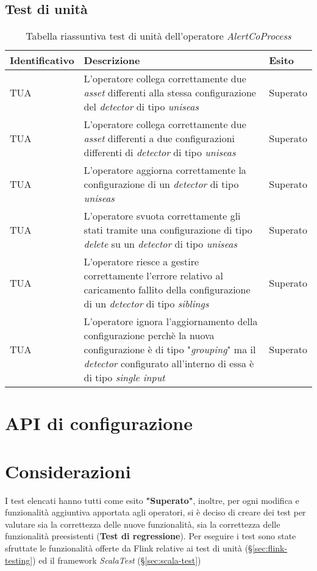\subsection{Test di unità}
{
\centering
\begin{longtable}{L{3cm} L{8.5cm} L{2cm}}
\caption{Tabella riassuntiva test di unità dell'operatore \textit{AlertCoProcess}}\\
\textbf{Identificativo} &
\textbf{Descrizione}&
\textbf{Esito}\\
\endhead
\hline

TUA & L'operatore collega correttamente due \textit{asset} differenti alla stessa configurazione del \textit{detector} di tipo \textit{uniseas} & Superato\\
\hline
TUA & L'operatore collega correttamente due \textit{asset} differenti a due configurazioni differenti di \textit{detector} di tipo \textit{uniseas} & Superato \\
\hline
TUA &  L'operatore aggiorna correttamente la configurazione di un \textit{detector} di tipo \textit{uniseas} & Superato\\
\hline
TUA & L'operatore svuota correttamente gli stati tramite una configurazione di tipo \textit{delete} su un \textit{detector} di tipo \textit{uniseas} & Superato \\
\hline
TUA & L'operatore riesce a gestire correttamente l'errore relativo al caricamento fallito della configurazione di un \textit{detector} di tipo \textit{siblings} & Superato\\
\hline
TUA & L'operatore ignora l'aggiornamento della configurazione perchè la nuova configurazione è di tipo "\textit{grouping}" ma il \textit{detector} configurato all'interno di essa è di tipo \textit{single input} & Superato \\
\hline
\end{longtable}
}

\section{API di configurazione}

\section{Considerazioni}
I test elencati hanno tutti come esito \textbf{"Superato"}, inoltre, per ogni modifica e funzionalità aggiuntiva apportata agli operatori, si è deciso di creare dei test per valutare sia la correttezza delle nuove funzionalità, sia la correttezza delle funzionalità preesistenti (\textbf{Test di regressione}). Per eseguire i test sono state sfruttate le funzionalità offerte da Flink relative ai test di unità (\S\ref{sec:flink-testing}) ed il \gls{framework} \textit{ScalaTest} (\S\ref{sec:scala-test})
